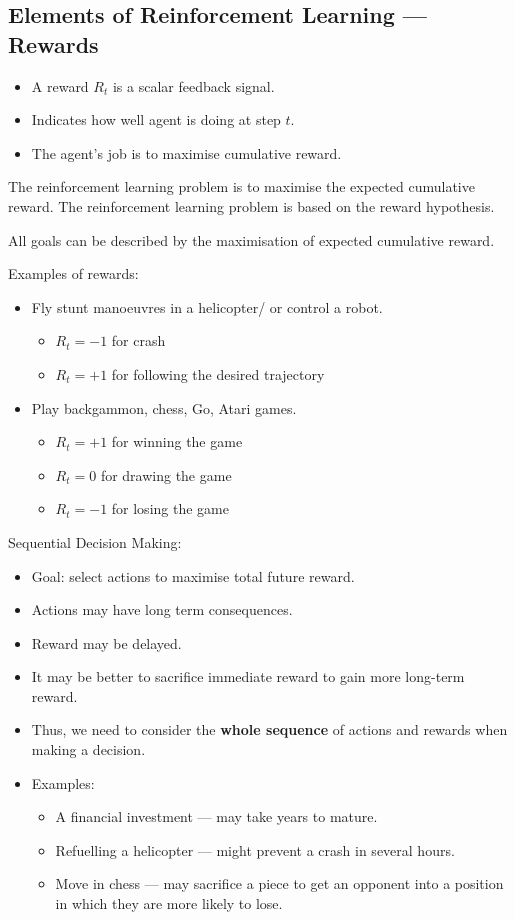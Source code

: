 \subsection{Elements of Reinforcement Learning --- Rewards}
\begin{itemize}
    \item A reward \(R_t\) is a scalar feedback signal.
    \item Indicates how well agent is doing at step \(t\).
    \item The agent's job is to maximise cumulative reward.
\end{itemize}
The reinforcement learning problem is to maximise the expected cumulative reward. The
reinforcement learning problem is based on the reward hypothesis.
\begin{definition}
    All goals can be described by the maximisation of expected cumulative reward.
\end{definition}
Examples of rewards:
\begin{itemize}
    \item Fly stunt manoeuvres in a helicopter/ or control a robot.
    \begin{itemize}
        \item \(R_t = -1 \) for crash
        \item \(R_t = +1\) for following the desired trajectory
    \end{itemize}
    \item Play backgammon, chess, Go, Atari games.
    \begin{itemize}
        \item \(R_t = +1\) for winning the game
        \item \(R_t = 0\) for drawing the game
        \item \(R_t = -1\) for losing the game
    \end{itemize}
\end{itemize}

Sequential Decision Making:
\begin{itemize}
    \item Goal: select actions to maximise total future reward.
    \item Actions may have long term consequences.
    \item Reward may be delayed.
    \item It may be better to sacrifice immediate reward to gain more long-term reward.
    \item Thus, we need to consider the \textbf{whole sequence} of actions and rewards when making a decision.
    \item Examples:
    \begin{itemize}
        \item A financial investment --- may take years to mature.
        \item Refuelling a helicopter --- might prevent a crash in several hours.
        \item Move in chess --- may sacrifice a piece to get an opponent into a position in which they are more likely to lose.
    \end{itemize}
\end{itemize}
